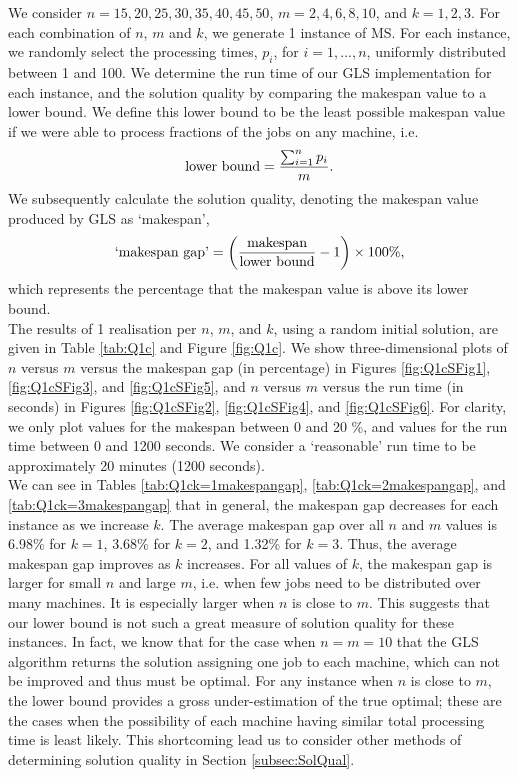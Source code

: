 \documentclass[12pt,a4paper,reqno]{article}
\begin{document}
We consider $n=15, 20, 25, 30, 35, 40, 45, 50$, $m=2,4,6,8,10$, and $k=1,2,3$. For each combination of $n$, $m$ and $k$, we generate 1 instance of MS. For each instance, we randomly select the processing times, $p_i$, for $i=1,...,n$, uniformly distributed between 1 and 100. We determine the run time of our GLS implementation for each instance, and the solution quality by comparing the makespan value to a lower bound. We define this lower bound to be the least possible makespan value if we were able to process fractions of the jobs on any machine, i.e.
\begin{equation}
\textnormal{lower bound} = \frac{\sum_{i=1}^n p_i}{m}. \label{eq:NaiveLB}
\end{equation}
We subsequently calculate the solution quality, denoting the makespan value produced by GLS as `makespan',
\begin{equation}
\textnormal{`makespan gap'} = \bigg(\frac{\textnormal{makespan}}{\textnormal{lower bound}} - 1 \bigg) \times 100\%, \label{eq:NaiveMakespanGap}
\end{equation}
which represents the percentage that the makespan value is above its lower bound. \\

The results of 1 realisation per $n$, $m$, and $k$, using a random initial solution, are given in Table \ref{tab:Q1c} and Figure \ref{fig:Q1c}.
We show three-dimensional plots of $n$ versus $m$ versus the makespan gap (in percentage) in Figures \ref{fig:Q1cSFig1}, \ref{fig:Q1cSFig3}, and \ref{fig:Q1cSFig5}, and $n$ versus $m$ versus the run time (in seconds) in Figures \ref{fig:Q1cSFig2}, \ref{fig:Q1cSFig4}, and \ref{fig:Q1cSFig6}. For clarity, we only plot values for the makespan between 0 and 20 \%, and values for the run time between 0 and 1200 seconds. We consider a `reasonable' run time to be approximately 20 minutes (1200 seconds). \\

We can see in Tables \ref{tab:Q1ck=1makespangap}, \ref{tab:Q1ck=2makespangap}, and \ref{tab:Q1ck=3makespangap} that in general, the makespan gap decreases for each instance as we increase $k$. The average makespan gap over all $n$ and $m$ values is 6.98\% for $k=1$, 3.68\% for $k=2$, and 1.32\% for $k=3$. Thus, the average makespan gap improves as $k$ increases. For all values of $k$, the makespan gap is larger for small $n$ and large $m$, i.e. when few jobs need to be distributed over many machines. It is especially larger when $n$ is close to $m$. This suggests that our lower bound is not such a great measure of solution quality for these instances. In fact, we know that for the case when $n=m=10$ that the GLS algorithm returns the solution assigning one job to each machine, which can not be improved and thus must be optimal. For any instance when $n$ is close to $m$, the lower bound provides a gross under-estimation of the true optimal; these are the cases when the possibility of each machine having similar total processing time is least likely. This shortcoming lead us to consider other methods of determining solution quality in Section \ref{subsec:SolQual}. \\
\end{document}
